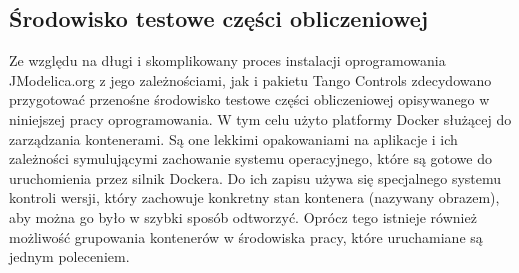 \subsection{Środowisko testowe części obliczeniowej}
\label{sub:czesc-wyzsza-docker}

Ze względu na długi i skomplikowany proces instalacji oprogramowania JModelica.org z jego zależnościami, jak i pakietu Tango Controls zdecydowano przygotować przenośne środowisko testowe części obliczeniowej opisywanego w niniejszej pracy oprogramowania. W tym celu użyto platformy Docker służącej do zarządzania kontenerami. Są one lekkimi opakowaniami na aplikacje i ich zależności symulującymi zachowanie systemu operacyjnego, które są gotowe do uruchomienia przez silnik Dockera. Do ich zapisu używa się specjalnego systemu kontroli wersji, który zachowuje konkretny stan kontenera (nazywany obrazem), aby można go było w szybki sposób odtworzyć.
Oprócz tego istnieje również możliwość grupowania kontenerów w środowiska pracy, które uruchamiane są jednym poleceniem.

